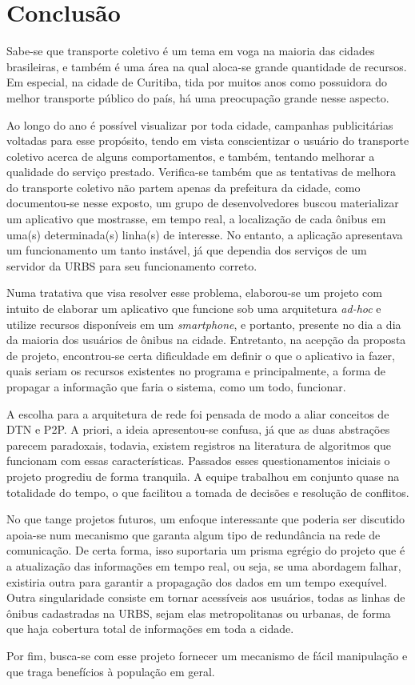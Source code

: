 \chapter{Conclusão}\label{cap:conclusao}

Sabe-se que transporte coletivo é um tema em voga na maioria das cidades brasileiras, e também é uma área na qual aloca-se grande quantidade de recursos. Em especial, na cidade de Curitiba, tida por muitos anos como possuidora do melhor transporte público do país, há uma preocupação grande nesse aspecto. 

Ao longo do ano é possível visualizar por toda cidade, campanhas publicitárias voltadas para esse propósito, tendo em vista conscientizar o usuário do transporte coletivo acerca de alguns comportamentos, e também, tentando melhorar a qualidade do serviço prestado. Verifica-se também  que as tentativas de melhora do transporte coletivo não partem apenas da prefeitura da cidade, como  documentou-se nesse exposto, um grupo de desenvolvedores buscou materializar um aplicativo que mostrasse, em tempo real, a localização de cada ônibus em uma(s) determinada(s) linha(s) de interesse. No entanto, a aplicação apresentava um funcionamento um tanto instável, já que dependia dos serviços de um servidor da URBS para seu funcionamento correto. 

Numa tratativa que visa resolver esse problema, elaborou-se um projeto com intuito de elaborar um aplicativo que funcione sob uma arquitetura \textit{ad-hoc} e utilize recursos disponíveis em um \textit{smartphone}, e portanto, presente no dia a dia da  maioria dos usuários de ônibus na cidade. Entretanto, na acepção da proposta de projeto, encontrou-se certa dificuldade em definir o que o aplicativo ia fazer, quais seriam os recursos existentes no programa e principalmente, a forma de propagar a informação que faria o sistema, como um todo, funcionar. 

A escolha para a arquitetura de rede foi pensada de modo a aliar conceitos de DTN e P2P. A priori, a ideia apresentou-se confusa, já que as duas abstrações parecem paradoxais, todavia, existem registros na literatura de algoritmos que funcionam com essas características. Passados esses questionamentos iniciais o projeto progrediu de forma tranquila. A equipe trabalhou em conjunto quase na totalidade do tempo, o que facilitou a tomada de decisões e resolução de conflitos. 

No que tange projetos futuros, um enfoque interessante que poderia ser discutido apoia-se num mecanismo que garanta algum tipo de redundância na rede de comunicação. De certa forma, isso suportaria um prisma egrégio do projeto que é a atualização das informações em tempo real, ou seja, se uma abordagem falhar, existiria outra para garantir a propagação dos dados em um tempo exequível. Outra singularidade consiste em tornar acessíveis aos usuários, todas as linhas de ônibus cadastradas na URBS, sejam elas metropolitanas ou urbanas, de forma que haja cobertura total de informações em toda a cidade.

Por fim, busca-se com esse projeto fornecer um mecanismo de fácil manipulação e que traga benefícios à população em geral.